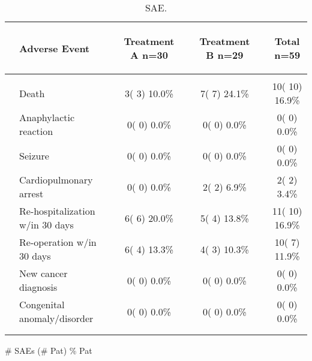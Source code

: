 \documentclass[dvips,10pt]{article}
\begin{document}
\begin{table}[t]
\caption
{ SAE. }
\begin{center}
\begin{tabular}{ @{}l@{}
@{}l@{}@{}p{1.5em}@{}@{}c@{}@{}p{1.5em}@{}@{}c@{}@{}p{1.5em}@{}@{}c@{}
}
\hline

& \parbox{6em}{\begin{center}Adverse Event\end{center}} && \parbox{6em}{\begin{center}Treatment A n=30\end{center}} && \parbox{6em}{\begin{center}Treatment B n=29\end{center}} && \parbox{6em}{\begin{center}Total n=59\end{center}} \\

\hline

\\
& Death && 3(  3) 10.0\% && 7(  7) 24.1\% && 10( 10) 16.9\% \\
& Anaphylactic reaction && 0(  0)  0.0\% && 0(  0)  0.0\% && 0(  0)  0.0\% \\
& Seizure && 0(  0)  0.0\% && 0(  0)  0.0\% && 0(  0)  0.0\% \\
& Cardiopulmonary arrest && 0(  0)  0.0\% && 2(  2)  6.9\% && 2(  2)  3.4\% \\
& Re-hospitalization w/in 30 days && 6(  6) 20.0\% && 5(  4) 13.8\% && 11( 10) 16.9\% \\
& Re-operation w/in 30 days && 6(  4) 13.3\% && 4(  3) 10.3\% && 10(  7) 11.9\% \\
& New cancer diagnosis && 0(  0)  0.0\% && 0(  0)  0.0\% && 0(  0)  0.0\% \\
& Congenital anomaly/disorder && 0(  0)  0.0\% && 0(  0)  0.0\% && 0(  0)  0.0\% \\
\\
\hline \\

\end{tabular}


\parbox{ 5in }{ \# SAEs (\# Pat) \% Pat } \\
 \vspace{1em}\end{center}
 \end{table}
\clearpage
\end{document}
